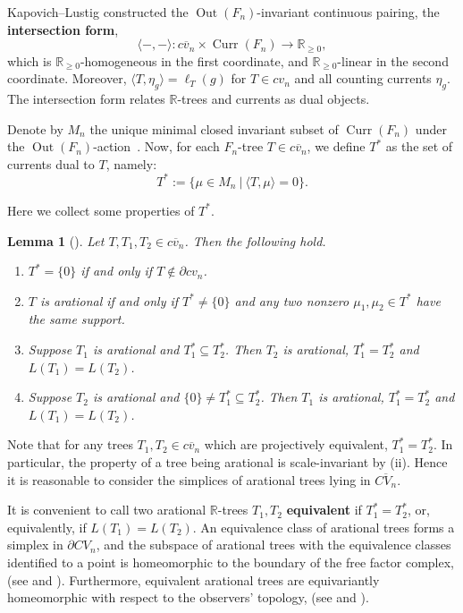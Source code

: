 \documentclass[11pt, letterpaper]{amsart}
\theoremstyle{plain}
\newtheorem{lemma}[theorem]{Lemma}
\theoremstyle{definition}
\newcommand{\R}{\mathbb{R}}
\DeclareMathOperator{\Out}{Out}
\DeclareMathOperator{\Curr}{Curr}
\newcommand{\ov}[1]{\overline{#1}}
\begin{document}
Kapovich--Lustig \cite[Theorem A]{kapovich2009intersection} constructed the
$\Out(F_n)$-invariant continuous pairing, the \textbf{intersection form},
\[
  \langle  -, - \rangle: \ov{cv_n} \times \Curr(F_n) \to \R_{\ge 0},
\]
which is $\R_{\ge 0}$-homogeneous in the first coordinate, and $\R_{\ge 0}$-linear
in the second coordinate. Moreover, $\langle T, \eta_g \rangle =
\ell_T(g)$ for $T \in cv_n$ and all counting currents $\eta_g$. The intersection
form relates $\R$-trees and currents as dual objects.


Denote by $M_n$ the unique minimal closed invariant subset of
$\Curr(F_n)$ under the $\Out(F_n)$-action~\cite[Section 5.8]{martin1997nonuniquely}. 
Now, for each $F_n$-tree $T \in \ov{cv_n}$, we define $T^*$ as the set of
currents dual to $T$, namely:
\[
  T^*:= \{\mu \in  M_n\ |\ \langle T, \mu \rangle = 0\}.
\]


Here we collect some properties of $T^*$. 

\begin{lemma}[{\cite[Theorem 4.4 and Remark 4.6]{bestvina2015boundary}}]\label{lem:propsTstars}
  Let $T, T_1, T_2 \in \ov{cv_n}$. Then the following hold.
  \begin{enumerate}[label=(\roman*)]
  \item $T^* = \{0\}$ if and only if $T \not\in \partial cv_n$.
    \item $T$ is arational if and only if $T^* \neq \{0\}$ and any two
      nonzero $\mu_1,\mu_2 \in T^*$ have the same support.
    \item Suppose $T_1$ is arational and $T_1^* \subseteq T_2^*$. Then 
      $T_2$ is arational, $T_1^*=T_2^*$ and $L(T_1)=L(T_2)$.
    \item Suppose $T_2$ is arational and $\{0\} \neq T_1^* \subseteq T_2^*$. Then
      $T_1$ is arational, $T_1^*=T_2^*$ and $L(T_1)=L(T_2)$.
  \end{enumerate}
\end{lemma}

Note that for any trees $T_1, T_2\in \overline{cv_n}$ which are projectively equivalent, $T_1^* = T_2^*$. In particular, the property of a tree being arational is scale-invariant by (ii). Hence it is reasonable to consider the simplices of arational trees lying in $\overline{CV_n}$.

It is convenient to call two arational $\R$-trees $T_1,T_2$ {\bf
  equivalent} if $T_1^*=T_2^*$, or, equivalently, if $L(T_1)=L(T_2)$. An
equivalence class of arational trees forms a simplex in $\partial
CV_n$, and the subspace of arational trees with the equivalence
classes identified to a point is homeomorphic to the boundary of the
free factor complex, (see \cite{bestvina2015boundary} and
\cite{hamenstaedt2014boundary}).
Furthermore, equivalent arational trees are equivariantly homeomorphic
with respect to the observers' topology, (see \cite[Proposition
3.2]{bestvina2015boundary} and \cite[Proposition 7.1]{hamenstaedt2014boundary}).
\end{document}
